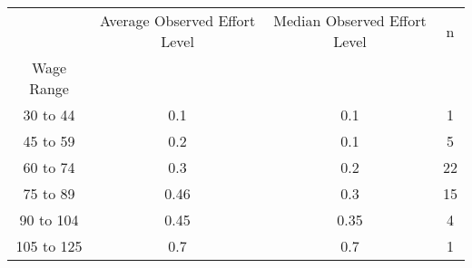 \begin{tabular}{cccc}
\toprule
{} & Average Observed Effort Level & Median Observed Effort Level &   n \\
Wage Range &                               &                              &     \\
\midrule
30 to 44   &                           0.1 &                          0.1 &   1 \\
45 to 59   &                           0.2 &                          0.1 &   5 \\
60 to 74   &                           0.3 &                          0.2 &  22 \\
75 to 89   &                          0.46 &                          0.3 &  15 \\
90 to 104  &                          0.45 &                         0.35 &   4 \\
105 to 125 &                           0.7 &                          0.7 &   1 \\
\bottomrule
\end{tabular}
